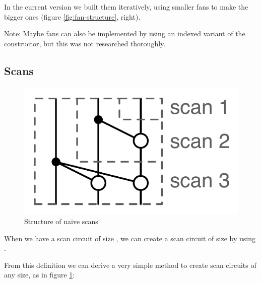 In the current version we built them iteratively, using smaller fans
to make the bigger ones (figure \ref{fig:fan-structure}, right).



Note: Maybe fans can also be implemented by using an indexed variant
of the  constructor, but this was not researched thoroughly.

\subsection{Scans}\label{scans-1}

\begin{figure}[ht]
\centering
\includegraphics[scale=0.4]{scan_structure.pdf}
\caption{Structure of naive scans}
\label{fig:scan-structure}
\end{figure}

When we have a scan circuit of size , we can create a scan
circuit of size  \AF{+}  by using .


From this definition we can derive a very simple method to create scan
circuits of any size, as in figure \ref{fig:scan-structure}:


